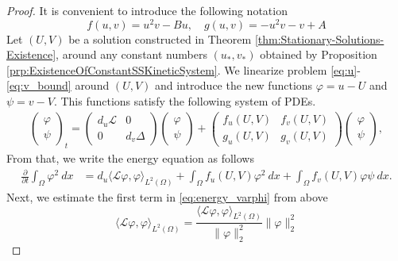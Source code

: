 \documentclass[12pt, a4paper]{article}
\theoremstyle{break}
\theoremstyle{break}
\theoremstyle{break}
\theoremstyle{break}
\theoremstyle{break}
\theoremstyle{break}
\theoremstyle{break}
\begin{document}
\begin{proof}
    It is convenient to introduce the following notation
    \begin{equation}
        \label{eq:non_linearities}
        f(u, v) = u^2v - Bu, \quad g(u,v) = -u^2v - v + A
    \end{equation}
    Let $(U, V)$ be a solution constructed in Theorem \ref{thm:Stationary-Solutions-Existence}, around any constant numbers $(u_*, v_*)$ obtained by Proposition \ref{prp:ExistenceOfConstantSSKineticSystem}. We linearize problem \eqref{eq:u}-\eqref{eq:v_bound} around $(U, V)$ and introduce the new functions $\varphi = u - U$ and $\psi = v - V$. This functions satisfy the following system of PDEs.
    \begin{align*}
        \begin{pmatrix}
            \varphi \\ \psi
        \end{pmatrix}_t
        =
        \begin{pmatrix}
            d_u \mathcal{L} & 0 \\ 0 & d_v \Delta
        \end{pmatrix}
        \begin{pmatrix}
            \varphi \\ \psi
        \end{pmatrix}
        +
        \begin{pmatrix}
            f_u(U,V) & f_v(U,V) \\ g_u(U,V) & g_v(U,V)
        \end{pmatrix}
        \begin{pmatrix}
            \varphi \\ \psi
        \end{pmatrix},
    \end{align*}
    From that, we write the energy equation as follows
    \begin{align}
        \label{eq:energy_varphi}
        \frac{\partial}{\partial t} \int_\Omega \varphi^2\:dx 
        &=
        d_u \langle \mathcal{L}\varphi, \varphi \rangle_{L^2(\Omega)} +  \int_\Omega f_u(U,V) \varphi^2 \:dx + \int_\Omega f_v(U,V) \varphi \psi \:dx.
    \end{align}
    Next, we estimate the first term in \eqref{eq:energy_varphi} from above
    \begin{equation}
        \label{eq:energy_varphi_1st_term}
        \langle \mathcal{L}\varphi, \varphi \rangle_{L^2(\Omega)} 
        =
        \frac{\langle \mathcal{L}\varphi, \varphi \rangle_{L^2(\Omega)}}{\|\varphi\|_2^2}\|\varphi\|_2^2

\end{equation}
\end{proof}
\end{document}
